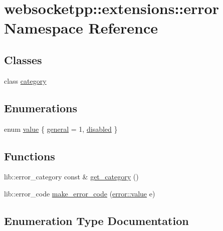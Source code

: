 \hypertarget{namespacewebsocketpp_1_1extensions_1_1error}{}\section{websocketpp\+:\+:extensions\+:\+:error Namespace Reference}
\label{namespacewebsocketpp_1_1extensions_1_1error}
\subsection*{Classes}
\begin{DoxyCompactItemize}
\item 
class \hyperlink{classwebsocketpp_1_1extensions_1_1error_1_1category}{category}
\end{DoxyCompactItemize}
\subsection*{Enumerations}
\begin{DoxyCompactItemize}
\item 
enum \hyperlink{namespacewebsocketpp_1_1extensions_1_1error_a18c17e561b5a8e2dfc0d98437039f7bf}{value} \{ \hyperlink{namespacewebsocketpp_1_1extensions_1_1error_a18c17e561b5a8e2dfc0d98437039f7bfac39a76eafbc93ace07bae99c7a786583}{general} = 1, 
\hyperlink{namespacewebsocketpp_1_1extensions_1_1error_a18c17e561b5a8e2dfc0d98437039f7bfa7e91bee498e79963a6fd48aac73bba5c}{disabled}
 \}
\end{DoxyCompactItemize}
\subsection*{Functions}
\begin{DoxyCompactItemize}
\item 
lib\+::error\+\_\+category const \& \hyperlink{namespacewebsocketpp_1_1extensions_1_1error_ad9668df3f23d13d9af779d1231cb4d4f}{get\+\_\+category} ()
\item 
lib\+::error\+\_\+code \hyperlink{namespacewebsocketpp_1_1extensions_1_1error_a00d7e8091d0c624a0b2308d1c35d9f9f}{make\+\_\+error\+\_\+code} (\hyperlink{namespacewebsocketpp_1_1extensions_1_1error_a18c17e561b5a8e2dfc0d98437039f7bf}{error\+::value} e)
\end{DoxyCompactItemize}


\subsection{Enumeration Type Documentation}
\hypertarget{namespacewebsocketpp_1_1extensions_1_1error_a18c17e561b5a8e2dfc0d98437039f7bf}{}
